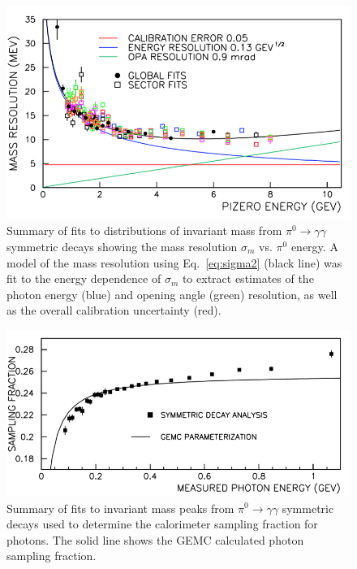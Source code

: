 \begin{figure}[h]
\centering
\includegraphics[width=1.0\columnwidth,keepaspectratio]{img/fx-study-summary.png}
\caption[]{Summary of fits to distributions of invariant mass from $\pi^0 \to \gamma \gamma$ symmetric
  decays showing the mass resolution $\sigma_m$ vs. $\pi^0$ energy. A model of the mass resolution using
  Eq.~\ref{eq:sigma2} (black line) was fit to the energy dependence of $\sigma_m$ to extract estimates of the
  photon energy (blue) and opening angle (green) resolution, as well as the overall calibration uncertainty (red).}
\label{fig:fx-study-summary}
\end{figure}

\begin{figure}[h]
\centering
\includegraphics[width=1.0\columnwidth,keepaspectratio]{img/fx-study-summary-2.png}
\caption[]{Summary of fits to invariant mass peaks from $\pi^0 \to \gamma \gamma$ symmetric decays
  used to determine the calorimeter sampling fraction for photons. The solid line shows the GEMC calculated
  photon sampling fraction.}
\label{fig:fx-study-summary-2}
\end{figure}

